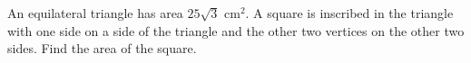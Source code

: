 An equilateral triangle has area $25\sqrt3\text{ cm}^2$. A square is inscribed in the triangle with one side on a side of the triangle and the other two vertices on the other two sides. Find the area of the square.
